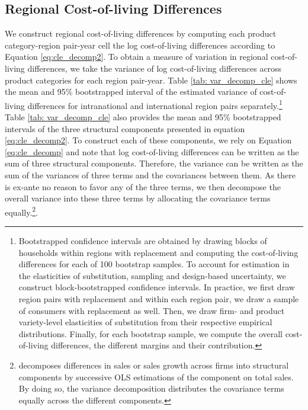 \subsection{Regional Cost-of-living Differences}
We construct regional cost-of-living differences by computing each product category-region pair-year cell the log cost-of-living differences according to Equation \ref{eq:cle_decomp2}. To obtain a measure of variation in regional cost-of-living differences, we take the variance of log cost-of-living differences across product categories for each region pair-year. Table \ref{tab: var_decomp_cle} shows the mean and 95\% bootstrapped interval of the estimated variance of cost-of-living differences for intranational and international region pairs separately.\footnote{Bootstrapped confidence intervals are obtained by drawing blocks of households within regions with replacement and computing the cost-of-living differences for each of 100 bootstrap samples. To account for estimation in the elasticities of substitution, sampling and design-based uncertainty, we construct block-bootstrapped confidence intervals. In practice, we first draw region pairs with replacement and within each region pair, we draw a sample of consumers with replacement as well. Then, we draw firm- and product variety-level elasticities of substitution from their respective empirical distributions. Finally, for each bootstrap sample, we compute the overall cost-of-living differences, the different margins and their contribution.} Table \ref{tab: var_decomp_cle} also provides the mean and 95\% bootstrapped intervals of the three structural components presented in equation \ref{eq:cle_decomp2}. To construct each of these components, we rely on Equation \ref{eq:cle_decomp} and note that log cost-of-living differences can be written as the sum of three structural components. Therefore, the variance can be written as the sum of the variances of three terms and the covariances between them. As there is ex-ante no reason to favor any of the three terms, we then decompose the overall variance into these three terms by allocating the covariance terms equally.\footnote{\citet{Hottman2016} decomposes differences in sales or sales growth across firms into structural components by successive OLS estimations of the component on total sales. By doing so, the variance decomposition distributes the covariance terms equally across the different components.}.

